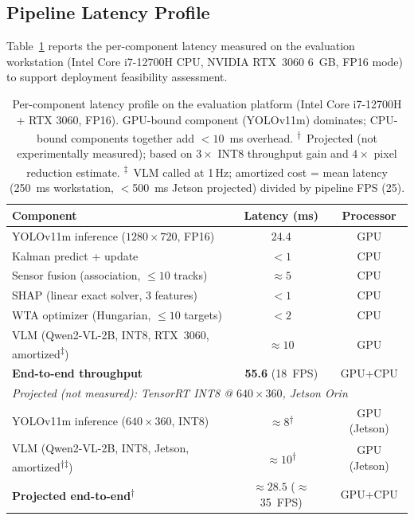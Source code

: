 \documentclass[drones,article,submit,pdftex]{Definitions/mdpi}
\begin{document}
\subsection{Pipeline Latency Profile}

Table~\ref{tab:latency} reports the per-component latency measured on the
evaluation workstation (Intel Core i7-12700H CPU, NVIDIA RTX~3060 6~GB,
FP16 mode) to support deployment feasibility assessment.

\begin{table}[ht]
  \centering
  \caption{Per-component latency profile on the evaluation platform
           (Intel Core i7-12700H + RTX 3060, FP16).
           GPU-bound component (YOLOv11m) dominates; CPU-bound components
           together add $<\!10$~ms overhead.
           \textsuperscript{†}~Projected (not experimentally measured);
           based on $3\times$ INT8 throughput gain and $4\times$ pixel
           reduction estimate.
           \textsuperscript{‡}~VLM called at 1\,Hz; amortized cost =
           mean latency (\SI{250}{ms} workstation, $<$\SI{500}{ms} Jetson projected)
           divided by pipeline FPS (25).}
  \label{tab:latency}
  \small
  \begin{tabular}{lcc}
    \toprule
    Component & Latency (ms) & Processor \\
    \midrule
    YOLOv11m inference ($1280\!\times\!720$, FP16) & 24.4 & GPU \\
    Kalman predict + update                         & $<\!1$ & CPU \\
    Sensor fusion (association, $\leq\!10$ tracks)  & $\approx\!5$ & CPU \\
    SHAP (linear exact solver, 3 features)          & $<\!1$ & CPU \\
    WTA optimizer (Hungarian, $\leq\!10$ targets)   & $<\!2$ & CPU \\
    VLM (Qwen2-VL-2B, INT8, RTX~3060, amortized\textsuperscript{‡}) & $\approx\!10$ & GPU \\
    \midrule
    \textbf{End-to-end throughput}                  & \textbf{55.6} (18~FPS) & GPU+CPU \\
    \midrule
    \multicolumn{3}{l}{\textit{Projected (not measured): TensorRT INT8 @ $640\!\times\!360$, Jetson Orin}} \\
    \quad YOLOv11m inference ($640\!\times\!360$, INT8)   & $\approx\!8$\textsuperscript{†} & GPU (Jetson) \\
    \quad VLM (Qwen2-VL-2B, INT8, Jetson, amortized\textsuperscript{†‡}) & $\approx\!10$\textsuperscript{†} & GPU (Jetson) \\
    \quad \textbf{Projected end-to-end}\textsuperscript{†} & $\approx\!28.5$ ($\approx$35~FPS) & GPU+CPU \\
    \bottomrule
  \end{tabular}
\end{table}
\end{document}
